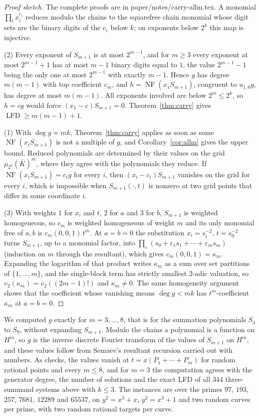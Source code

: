 \documentclass[11pt]{article}
\theoremstyle{definition}\newtheorem{definition}[theorem]{Definition}
\theoremstyle{remark}\newtheorem{remark}[theorem]{Remark}
\newcommand{\lfd}{\operatorname{LFD}}
\newcommand{\NF}{\operatorname{NF}}
\newcommand{\codeus}{\textunderscore\allowbreak}
\newcommand{\code}[1]{{\ttfamily\let\_\codeus#1}}
\begin{document}
\begin{proof}[Proof sketch]
The complete proofs are in \code{paper/notes/carry-allm.tex}. A monomial
$\prod_ix_i^{e_i}$ reduces modulo the chains to the squarefree chain monomial
whose digit sets are the binary digits of the $e_i$ below $k$; on exponents
below $2^k$ this map is injective.

(2) Every exponent of $S_{m+1}$ is at most $2^{m-1}$, and for $m\ge3$ every
exponent at most $2^{m-1}+1$ has at most $m-1$ binary digits equal to $1$,
the value $2^{m-1}-1$ being the only one at most $2^{m-1}$ with exactly
$m-1$. Hence
$g$ has degree $m(m-1)$ with top coefficient $c_m$, and $h=\NF(x_1S_{m+1})$,
congruent to $u_{1,0}g$, has degree at most $m(m-1)$. All exponents involved
are below $2^m\le2^k$, so $h=cg$ would force $(x_1-c)S_{m+1}=0$.
Theorem~\ref{thm:carry} gives $\lfd\ge m(m-1)+1$.

(1) With $\deg g=mk$, Theorem~\ref{thm:carry} applies as soon as some
$\NF(x_iS_{m+1})$ is not a multiple of $g$, and Corollary~\ref{cor:allm}
gives the upper bound. Reduced polynomials are determined by their values on
the grid $\mu_{2^k}(\bar K)^m$, where they agree with the polynomials they
reduce. If $\NF(x_iS_{m+1})=c_ig$ for every $i$, then $(x_i-c_i)S_{m+1}$
vanishes on the grid for every $i$, which is impossible when
$S_{m+1}(\cdot,t)$ is nonzero at two grid points that differ in some
coordinate $i$.

(3) With weights $1$ for $x_i$ and $t$, $2$ for $a$ and $3$ for $b$,
$S_{m+1}$ is weighted homogeneous, so $c_m$ is weighted homogeneous of
weight $m$ and its only monomial free of $a,b$ is $c_m(0,0,1)\,t^m$. At
$a=b=0$ the substitution $x_i=s_i^{-2}$, $t=s_0^{-2}$ turns $S_{m+1}$, up to
a monomial factor, into $\prod_\varepsilon(s_0+\varepsilon_1s_1+\cdots+\varepsilon_ms_m)$
(induction on $m$ through the resultant), which gives $c_m(0,0,1)=\kappa_m$.
Expanding the logarithm of that product writes $\kappa_m$ as a sum over set
partitions of $\{1,\ldots,m\}$, and the single-block term has strictly
smallest $2$-adic valuation, so $v_2(\kappa_m)=v_2((2m-1)!)$ and
$\kappa_m\ne0$. The same homogeneity argument shows that the coefficient
whose vanishing means $\deg g<mk$ has $t^m$-coefficient $\kappa_m$ at
$a=b=0$.
\end{proof}

We computed $g$ exactly for $m=3,\ldots,8$, that is for the summation
polynomials $S_4$ to $S_9$, without expanding $S_{m+1}$. Modulo the chains a
polynomial is a function on $H^m$, so $g$ is the inverse discrete Fourier
transform of the values of $S_{m+1}$ on $H^m$, and these values follow from
Semaev's resultant recursion carried out with numbers. As checks, the values
vanish at $t=x(P_1+\cdots+P_m)$ for random rational points and every
$m\le8$, and for $m=3$ the computation agrees with the generator degree, the
number of solutions and the exact LFD of all $344$ three-summand systems
above with $k\le3$. The instances are over the primes $97$, $193$, $257$,
$7681$, $12289$ and $65537$, on $y^2=x^3+x$, $y^2=x^3+1$ and two random
curves per prime, with two random rational targets per curve.
\end{document}

